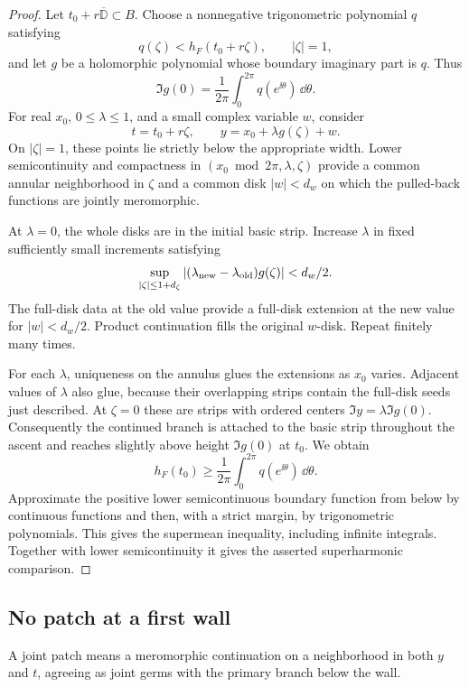 \begin{proof}
Let \(t_0+r\overline{\mathbb D}\subset B\).  Choose a
nonnegative trigonometric polynomial \(q\) satisfying
\[
 q(\zeta)<h_F(t_0+r\zeta),\qquad |\zeta|=1,
 \]
and let \(g\) be a holomorphic polynomial whose boundary
imaginary part is \(q\).  Thus
\[
 \Im g(0)=\frac1{2\pi}\int_0^{2\pi}q(e^{\ii\theta})\,\dd\theta.
 \]
For real \(x_0\), \(0\le\lambda\le1\), and a small complex
variable \(w\), consider
\begin{equation}
 t=t_0+r\zeta,\qquad y=x_0+\lambda g(\zeta)+w.
 \label{cont:width-disks}
\end{equation}
On \(|\zeta|=1\), these points lie strictly below the appropriate
width.  Lower semicontinuity and compactness in
\((x_0\bmod 2\pi,\lambda,\zeta)\) provide a common annular
neighborhood in \(\zeta\) and a common disk \(|w|<d_w\) on
which the pulled-back functions are jointly meromorphic.

At \(\lambda=0\), the whole disks are in the initial basic
strip.  Increase \(\lambda\) in fixed sufficiently small
increments satisfying
\[
 \sup_{|\zeta|\le1+d_\zeta}
 |(\lambda_{\rm new}-\lambda_{\rm old})g(\zeta)|<d_w/2.
 \]
The full-disk data at the old value provide a full-disk
extension at the new value for \(|w|<d_w/2\).  Product
continuation fills the original \(w\)-disk.  Repeat finitely
many times.

For each \(\lambda\), uniqueness on the annulus glues the
extensions as \(x_0\) varies.  Adjacent values of \(\lambda\)
also glue, because their overlapping strips contain the
full-disk seeds just described.  At \(\zeta=0\) these are
strips with ordered centers
\(\Im y=\lambda\Im g(0)\).  Consequently the continued branch
is attached to the basic strip throughout the ascent and
reaches slightly above height \(\Im g(0)\) at \(t_0\).
We obtain
\[
 h_F(t_0)\ge \frac1{2\pi}
 \int_0^{2\pi}q(e^{\ii\theta})\,\dd\theta.
 \]
Approximate the positive lower semicontinuous boundary
function from below by continuous functions and then, with
a strict margin, by trigonometric polynomials.  This gives
the supermean inequality, including infinite integrals.
Together with lower semicontinuity it gives the asserted
superharmonic comparison.
\end{proof}

\subsection{No patch at a first wall}

A joint patch means a meromorphic continuation on a neighborhood
in both \(y\) and \(t\), agreeing as joint germs with the primary
branch below the wall.

